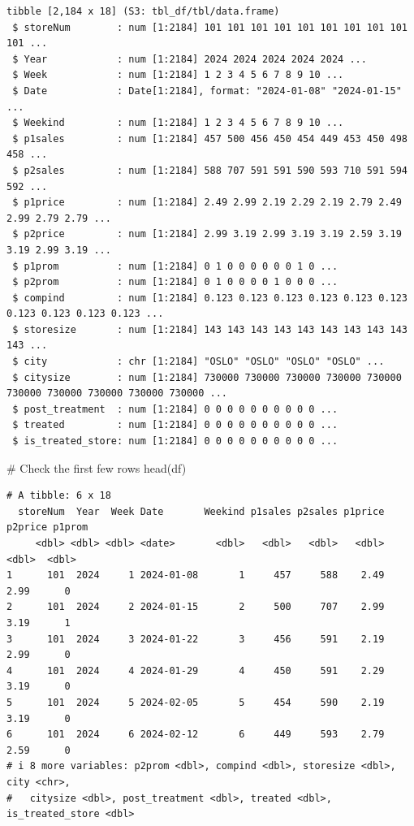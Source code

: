 \documentclass[
  letterpaper,
  DIV=11,
  numbers=noendperiod]{scrartcl}
\newenvironment{Shaded}{\begin{snugshade}}{\end{snugshade}}
\newcommand{\CommentTok}[1]{\textcolor[rgb]{0.37,0.37,0.37}{#1}}
\newcommand{\FunctionTok}[1]{\textcolor[rgb]{0.28,0.35,0.67}{#1}}
\newcommand{\NormalTok}[1]{\textcolor[rgb]{0.00,0.23,0.31}{#1}}
\begin{document}
\begin{verbatim}
tibble [2,184 x 18] (S3: tbl_df/tbl/data.frame)
 $ storeNum        : num [1:2184] 101 101 101 101 101 101 101 101 101 101 ...
 $ Year            : num [1:2184] 2024 2024 2024 2024 2024 ...
 $ Week            : num [1:2184] 1 2 3 4 5 6 7 8 9 10 ...
 $ Date            : Date[1:2184], format: "2024-01-08" "2024-01-15" ...
 $ Weekind         : num [1:2184] 1 2 3 4 5 6 7 8 9 10 ...
 $ p1sales         : num [1:2184] 457 500 456 450 454 449 453 450 498 458 ...
 $ p2sales         : num [1:2184] 588 707 591 591 590 593 710 591 594 592 ...
 $ p1price         : num [1:2184] 2.49 2.99 2.19 2.29 2.19 2.79 2.49 2.99 2.79 2.79 ...
 $ p2price         : num [1:2184] 2.99 3.19 2.99 3.19 3.19 2.59 3.19 3.19 2.99 3.19 ...
 $ p1prom          : num [1:2184] 0 1 0 0 0 0 0 0 1 0 ...
 $ p2prom          : num [1:2184] 0 1 0 0 0 0 1 0 0 0 ...
 $ compind         : num [1:2184] 0.123 0.123 0.123 0.123 0.123 0.123 0.123 0.123 0.123 0.123 ...
 $ storesize       : num [1:2184] 143 143 143 143 143 143 143 143 143 143 ...
 $ city            : chr [1:2184] "OSLO" "OSLO" "OSLO" "OSLO" ...
 $ citysize        : num [1:2184] 730000 730000 730000 730000 730000 730000 730000 730000 730000 730000 ...
 $ post_treatment  : num [1:2184] 0 0 0 0 0 0 0 0 0 0 ...
 $ treated         : num [1:2184] 0 0 0 0 0 0 0 0 0 0 ...
 $ is_treated_store: num [1:2184] 0 0 0 0 0 0 0 0 0 0 ...
\end{verbatim}

\begin{Shaded}
\begin{Highlighting}[]
\CommentTok{\# Check the first few rows}
\FunctionTok{head}\NormalTok{(df)}
\end{Highlighting}
\end{Shaded}

\begin{verbatim}
# A tibble: 6 x 18
  storeNum  Year  Week Date       Weekind p1sales p2sales p1price p2price p1prom
     <dbl> <dbl> <dbl> <date>       <dbl>   <dbl>   <dbl>   <dbl>   <dbl>  <dbl>
1      101  2024     1 2024-01-08       1     457     588    2.49    2.99      0
2      101  2024     2 2024-01-15       2     500     707    2.99    3.19      1
3      101  2024     3 2024-01-22       3     456     591    2.19    2.99      0
4      101  2024     4 2024-01-29       4     450     591    2.29    3.19      0
5      101  2024     5 2024-02-05       5     454     590    2.19    3.19      0
6      101  2024     6 2024-02-12       6     449     593    2.79    2.59      0
# i 8 more variables: p2prom <dbl>, compind <dbl>, storesize <dbl>, city <chr>,
#   citysize <dbl>, post_treatment <dbl>, treated <dbl>, is_treated_store <dbl>
\end{verbatim}
\end{document}
